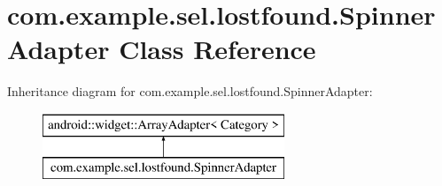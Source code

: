 \hypertarget{classcom_1_1example_1_1sel_1_1lostfound_1_1SpinnerAdapter}{}\section{com.\+example.\+sel.\+lostfound.\+Spinner\+Adapter Class Reference}
\label{classcom_1_1example_1_1sel_1_1lostfound_1_1SpinnerAdapter}
Inheritance diagram for com.\+example.\+sel.\+lostfound.\+Spinner\+Adapter\+:\begin{figure}[H]
\begin{center}
\leavevmode
\includegraphics[height=2.000000cm]{classcom_1_1example_1_1sel_1_1lostfound_1_1SpinnerAdapter}
\end{center}
\end{figure}
